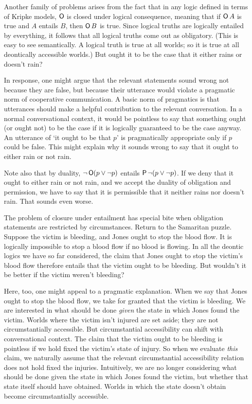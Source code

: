 
Another family of problems arises from the fact that in any logic defined in
terms of Kripke models, $\operatorname{\mathsf{O}}$ is closed under logical consequence, meaning that
if $\operatorname{\mathsf{O}} A$ is true and $A$ entails $B$, then $\operatorname{\mathsf{O}} B$ is true. Since logical
truths are logically entailed by everything, it follows that all logical truths
come out as obligatory. (This is easy to see semantically. A logical truth is
true at all worlds; so it is true at all deontically accessible worlds.) But ought it to be the case that it either rains or doesn't rain?

In response, one might argue that the relevant statements sound wrong not
because they are false, but because their utterance would violate a pragmatic
norm of cooperative communication. A basic norm of pragmatics is that utterances
should make a helpful contribution to the relevant conversation. In a normal
conversational context, it would be pointless to say that something ought (or
ought not) to be the case if it is logically guaranteed to be the case anyway.
An utterance of `it ought to be that $p$' is pragmatically appropriate only if
$p$ could be false. This might explain why it sounds wrong to say that it ought
to either rain or not rain.

Note also that by duality, $\neg\operatorname{\mathsf{O}}(p \lor \neg p)$ entails
$\operatorname{\mathsf{P}} \neg(p \lor \neg p)$. If we deny that it ought to either rain or not rain,
and we accept the duality of obligation and permission, we have to say that it
is permissible that it neither rains nor doesn't rain. That sounds even worse.

The problem of closure under entailment has special bite when obligation
statements are restricted by circumstances. Return to the Samaritan
puzzle. Suppose the victim is bleeding, and Jones ought to stop the blood
flow. It is logically impossible to stop a blood flow if no blood is flowing. In
all the deontic logics we have so far considered, the claim that Jones ought to
stop the victim's blood flow therefore entails that the victim ought to be
bleeding. But wouldn't it be better if the victim weren't bleeding?

Here, too, one might appeal to a pragmatic explanation. When we say that Jones
ought to stop the blood flow, we take for granted that the victim is bleeding.
We are interested in what should be done \emph{given} the state in which Jones
found the victim. Worlds where the victim isn't injured are set aside; they are
not circumstantially accessible. But circumstantial accessibility can shift with
conversational context. The claim that the victim ought to be bleeding is
pointless if we hold fixed the victim's state of injury. So when we evaluate
\emph{this} claim, we naturally assume that the relevant circumstantial
accessibility relation does not hold fixed the injuries. Intuitively, we are no
longer considering what should be done given the state in which Jones found the
victim, but whether that state itself should have obtained. Worlds in which
the state doesn't obtain become circumstantially accessible.

